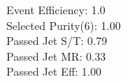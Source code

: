 Event Efficiency:   1.0\\ 
Selected Purity(6): 1.00\\ 
Passed Jet S/T:     0.79\\ 
Passed Jet MR:      0.33\\ 
Passed Jet Eff:     1.00